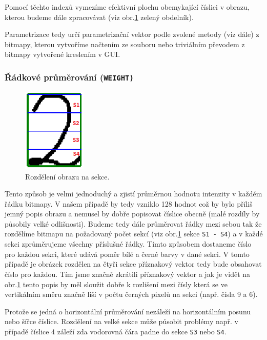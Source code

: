 \documentclass[12pt]{article}
\begin{document}
\pagebreak

Pomocí těchto indexů vymezíme efektivní plochu obemykající číslici v obrazu, kterou budeme dále zpracovávat (viz obr.\ref{obr1} zelený obdelník).

Parametrizace tedy určí parametrizační vektor podle zvolené metody (viz dále) z bitmapy, kterou vytvoříme načtením ze souboru nebo triviálním převodem z bitmapy vytvořené kreslením v GUI.

\subsubsection{Řádkové průměrování (\texttt{WEIGHT)}}
\begin{figure}
\centering
\vspace{-0.5cm}
\includegraphics[height=4cm]{WeightSections.png}
\caption{Rozdělení obrazu na sekce.}
\label{obr1}
\end{figure}
Tento způsob je velmi jednoduchý a zjistí průměrnou hodnotu intenzity v každém řádku bitmapy. V našem případě by tedy vzniklo 128 hodnot což by bylo příliš jemný popis obrazu a nemusel by dobře popisovat číslice obecně (malé rozdíly by působily velké odlišnosti). Budeme tedy dále průměrovat řádky mezi sebou tak že rozdělíme bitmapu na požadovaný počet sekcí (viz obr.\ref{obr1} sekce \texttt{S1 - S4}) a v každé sekci zprůměrujeme všechny příslušné řádky. Tímto způsobem dostaneme číslo pro každou sekci, které udává poměr bílé a černé barvy v dané sekci. V tomto případě je obrázek rozdělen na čtyři sekce příznakový vektor tedy bude obsahovat číslo pro každou. Tím jsme značně zkrátili příznakový vektor a jak je vidět na obr.\ref{obr1} tento popis by měl sloužit dobře k rozlišení mezi čísly která se ve vertikálním směru značně liší v počtu černých pixelů na sekci (např. čísla 9 a 6).

Protože se jedná o horizontální průměrování nezáleží na horizontálním posunu nebo šířce číslice. Rozdělení na velké sekce může působit problémy např. v případě číslice 4 záleží zda vodorovná čára padne do sekce \texttt{S3} nebo \texttt{S4}.
\pagebreak
\end{document}
